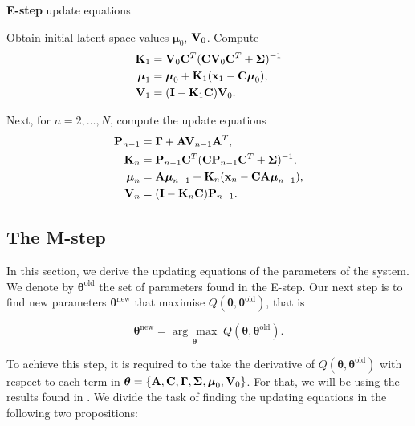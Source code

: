 \documentclass[11pt]{article}
\numberwithin{equation}{section}
\newcommand{\argmax}[1]{\underset{#1}{\operatorname{arg}\,\operatorname{max}}\;}
\newcommand{\x}{{\bf x}}
\begin{document}
\begin{tcolorbox}
\textbf{E-step} update equations

	Obtain initial latent-space values $\boldsymbol{\mu}_0$, ${\bf V}_0$. Compute
	\begin{align}
		{\bf K}_1 &= {\bf V}_0{\bf C}^T({\bf C} {\bf V}_0 {\bf C}^T + \boldsymbol\Sigma)^{-1}\\
		\boldsymbol{\mu}_1 &= \boldsymbol{\mu}_0 + {\bf K}_1(\x_1 -{\bf C}\boldsymbol\mu_0),\\
		{\bf V}_1 &=  ({\bf I} - {\bf K}_1{\bf C}){\bf V}_0.
	\end{align}

	Next, for $n=2, \ldots, N$, compute the update equations
	\begin{align}
		{\bf P}_{n-1} &= \boldsymbol{\Gamma} + {\bf A}{\bf V}_{n-1}{\bf A}^T,\\
		{\bf K}_n &= {\bf P}_{n-1}{\bf C}^T({\bf C} {\bf P}_{n-1}{\bf C}^T + \boldsymbol\Sigma)^{-1},\\
		\boldsymbol{\mu}_n &= {\bf A}\boldsymbol{\mu}_{n-1} + {\bf K}_n(\x_n -{\bf C}{\bf A}\boldsymbol\mu_{n-1}),\\
		{\bf V}_n &=  ({\bf I} - {\bf K}_n{\bf C}){\bf P}_{n-1}.
	\end{align}
\end{tcolorbox}


\subsection{The M-step}
In this section, we derive the updating equations of the parameters of the system. We denote by $\boldsymbol{\theta}^\text{old}$ the set of parameters found in the E-step. Our next step is to find new parameters $\boldsymbol{\theta}^\text{new}$ that maximise $Q(\boldsymbol\theta, \boldsymbol\theta^\text{old})$, that is

\begin{equation}
	\boldsymbol{\theta}^\text{new} = \argmax{\boldsymbol\theta} Q(\boldsymbol\theta, \boldsymbol\theta^\text{old}).
\end{equation}

To achieve this step, it is required to the take the derivative of $Q(\boldsymbol{\theta}, \boldsymbol{\theta}^\text{old})$ with respect to each term in $\boldsymbol\theta = \{{\bf A}, {\bf C}, \boldsymbol\Gamma, \boldsymbol\Sigma, \boldsymbol\mu_0, {\bf V}_0\}$. For that, we will be using the results found in \cite{matrix-cookbook}. We divide the task of finding the updating equations in the following two propositions:
\end{document}
